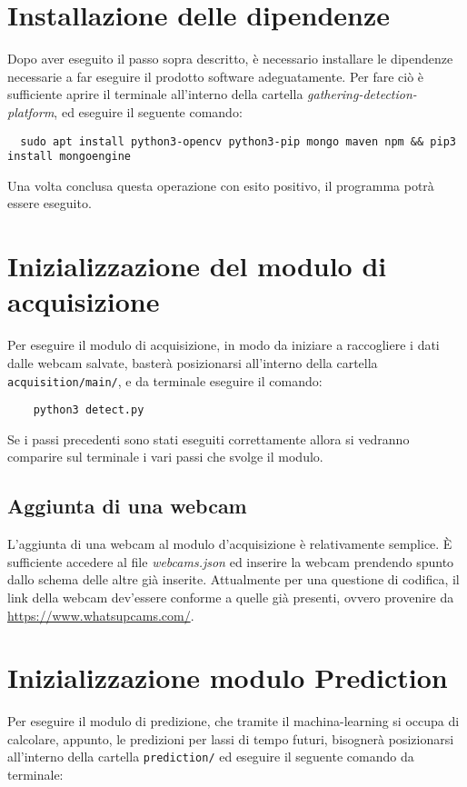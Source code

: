 \section{Installazione delle dipendenze}\label{ProceduraDiInstallazioneInstallazioneDipendenze}
Dopo aver eseguito il passo sopra descritto, è necessario installare le dipendenze necessarie a far eseguire il prodotto software adeguatamente.
Per fare ciò è sufficiente aprire il terminale all'interno della cartella \textit{gathering-detection-platform}, ed eseguire il seguente comando:
\begin{lstlisting}
  sudo apt install python3-opencv python3-pip mongo maven npm && pip3 install mongoengine
\end{lstlisting}

Una volta conclusa questa operazione con esito positivo, il programma potrà essere eseguito.

\section{Inizializzazione del modulo di acquisizione}\label{ProceduraDiInstallazioneInizializzazioneModuloAcquisition}
Per eseguire il modulo di acquisizione, in modo da iniziare a raccogliere i dati dalle webcam salvate, basterà posizionarsi all'interno della cartella \texttt{acquisition/main/}, e da terminale eseguire il comando:
\begin{lstlisting}
    python3 detect.py
\end{lstlisting}
Se i passi precedenti sono stati eseguiti correttamente allora si vedranno comparire sul terminale i vari passi che svolge il modulo.

\subsection{Aggiunta di una webcam}
L'aggiunta di una webcam al modulo d'acquisizione è relativamente semplice.
È sufficiente accedere al file \textit{webcams.json} ed inserire la webcam prendendo spunto dallo schema delle altre già inserite.
Attualmente per una questione di codifica, il link della webcam dev'essere conforme a quelle già presenti, ovvero provenire da \url{https://www.whatsupcams.com/}.


\section{Inizializzazione modulo Prediction}\label{ProceduraDiInstallazioneInizializzazioneModuloPrediction}
Per eseguire il modulo di predizione, che tramite il machina-learning si occupa di calcolare, appunto, le predizioni per lassi di tempo futuri, bisognerà posizionarsi all'interno della cartella \texttt{prediction/} ed eseguire il seguente comando da terminale:

